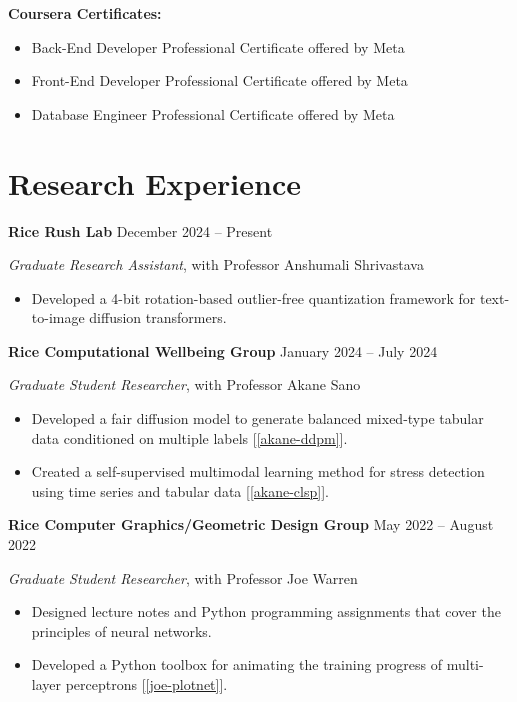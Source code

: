 \documentclass[11pt]{article}
\begin{document}
\vspace{\lineskip}

\textbf{Coursera Certificates:}

\begin{itemize}
    \item Back-End Developer Professional Certificate offered by Meta
    \item Front-End Developer Professional Certificate offered by Meta
    \item Database Engineer Professional Certificate offered by Meta
\end{itemize}

\section*{Research Experience}

\textbf{Rice Rush Lab} \hfill December 2024 -- Present

\textit{Graduate Research Assistant}, with Professor Anshumali Shrivastava

\begin{itemize}
    \item Developed a 4-bit rotation-based outlier-free quantization framework for text-to-image diffusion transformers.
\end{itemize}

\vspace{\lineskip}

\textbf{Rice Computational Wellbeing Group} \hfill January 2024 -- July 2024

\textit{Graduate Student Researcher}, with Professor Akane Sano

\begin{itemize}
    \item Developed a fair diffusion model to generate balanced mixed-type tabular data conditioned on multiple labels [\ref{akane-ddpm}].
    \item Created a self-supervised multimodal learning method for stress detection using time series and tabular data [\ref{akane-clsp}].
\end{itemize}

\vspace{\lineskip}

\textbf{Rice Computer Graphics/Geometric Design Group} \hfill May 2022 -- August 2022

\textit{Graduate Student Researcher}, with Professor Joe Warren

\begin{itemize}
    \item Designed lecture notes and Python programming assignments that cover the principles of neural networks.
    \item Developed a Python toolbox for animating the training progress of multi-layer perceptrons [\ref{joe-plotnet}].
\end{itemize}
\end{document}
